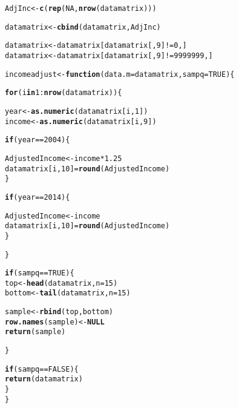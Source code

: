 \documentclass{article}\usepackage[]{graphicx}\usepackage[]{color}
\makeatletter
\newcommand{\hlnum}[1]{\textcolor[rgb]{0.686,0.059,0.569}{#1}}%
\newcommand{\hlopt}[1]{\textcolor[rgb]{0,0,0}{#1}}%
\newcommand{\hlstd}[1]{\textcolor[rgb]{0.345,0.345,0.345}{#1}}%
\newcommand{\hlkwa}[1]{\textcolor[rgb]{0.161,0.373,0.58}{\textbf{#1}}}%
\newcommand{\hlkwb}[1]{\textcolor[rgb]{0.69,0.353,0.396}{#1}}%
\newcommand{\hlkwc}[1]{\textcolor[rgb]{0.333,0.667,0.333}{#1}}%
\newcommand{\hlkwd}[1]{\textcolor[rgb]{0.737,0.353,0.396}{\textbf{#1}}}%
\newenvironment{kframe}{%
 \def\at@end@of@kframe{}%
 \ifinner\ifhmode%
  \def\at@end@of@kframe{\end{minipage}}%
  \begin{minipage}{\columnwidth}%
 \fi\fi%
 \def\FrameCommand##1{\hskip\@totalleftmargin \hskip-\fboxsep
 \colorbox{shadecolor}{##1}\hskip-\fboxsep
     \hskip-\linewidth \hskip-\@totalleftmargin \hskip\columnwidth}%
 \MakeFramed {\advance\hsize-\width
   \@totalleftmargin\z@ \linewidth\hsize
   \@setminipage}}%
 {\par\unskip\endMakeFramed%
 \at@end@of@kframe}
\newenvironment{knitrout}{}{} %
\makeatother
\begin{document}
\begin{knitrout}
\begin{kframe}
\begin{alltt}
\hlstd{AdjInc} \hlkwb{<-} \hlkwd{c}\hlstd{(}\hlkwd{rep}\hlstd{(}\hlnum{NA}\hlstd{,} \hlkwd{nrow}\hlstd{(datamatrix)))}

\hlstd{datamatrix} \hlkwb{<-} \hlkwd{cbind}\hlstd{(datamatrix, AdjInc)}

\hlstd{datamatrix} \hlkwb{<-} \hlstd{datamatrix[datamatrix[,}\hlnum{9}\hlstd{]}\hlopt{!=} \hlnum{0}\hlstd{,]}
\hlstd{datamatrix} \hlkwb{<-} \hlstd{datamatrix[datamatrix[,}\hlnum{9}\hlstd{]}\hlopt{!=} \hlnum{9999999}\hlstd{,]}



\hlstd{incomeadjust} \hlkwb{<-} \hlkwa{function}\hlstd{(}\hlkwc{data.m} \hlstd{= datamatrix,} \hlkwc{sampq} \hlstd{=} \hlnum{TRUE}\hlstd{)\{}

  \hlkwa{for} \hlstd{(i} \hlkwa{in} \hlnum{1}\hlopt{:}\hlkwd{nrow}\hlstd{(datamatrix))\{}

    \hlstd{year} \hlkwb{<-} \hlkwd{as.numeric}\hlstd{(datamatrix[i,}\hlnum{1}\hlstd{])}
    \hlstd{income} \hlkwb{<-} \hlkwd{as.numeric}\hlstd{(datamatrix[i,}\hlnum{9}\hlstd{])}

    \hlkwa{if} \hlstd{(year} \hlopt{==} \hlnum{2004}\hlstd{)\{}

      \hlstd{AdjustedIncome} \hlkwb{<-} \hlstd{income} \hlopt{*} \hlnum{1.25}
      \hlstd{datamatrix[i,}\hlnum{10}\hlstd{]} \hlkwb{=} \hlkwd{round}\hlstd{(AdjustedIncome)}
    \hlstd{\}}

    \hlkwa{if} \hlstd{(year} \hlopt{==} \hlnum{2014}\hlstd{)\{}

      \hlstd{AdjustedIncome} \hlkwb{<-} \hlstd{income}
      \hlstd{datamatrix[i,}\hlnum{10}\hlstd{]} \hlkwb{=} \hlkwd{round}\hlstd{(AdjustedIncome)}
    \hlstd{\}}


  \hlstd{\}}

 \hlkwa{if} \hlstd{(sampq} \hlopt{==} \hlnum{TRUE}\hlstd{)\{}
  \hlstd{top} \hlkwb{<-} \hlkwd{head}\hlstd{(datamatrix,} \hlkwc{n}\hlstd{=}\hlnum{15}\hlstd{)}
  \hlstd{bottom}\hlkwb{<-} \hlkwd{tail}\hlstd{(datamatrix,} \hlkwc{n}\hlstd{=}\hlnum{15}\hlstd{)}

  \hlstd{sample} \hlkwb{<-} \hlkwd{rbind}\hlstd{(top,bottom)}
  \hlkwd{row.names}\hlstd{(sample)} \hlkwb{<-} \hlkwa{NULL}
  \hlkwd{return}\hlstd{(sample)}

 \hlstd{\}}

 \hlkwa{if} \hlstd{(sampq} \hlopt{==} \hlnum{FALSE}\hlstd{)\{}
   \hlkwd{return}\hlstd{(datamatrix)}
 \hlstd{\}}
\hlstd{\}}


\end{alltt}
\end{kframe}
\end{knitrout}
\end{document}

